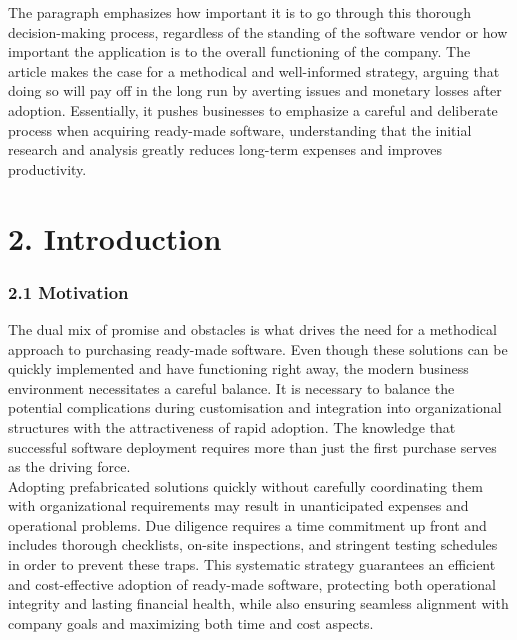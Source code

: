 \documentclass[letterpaper, 11pt]{report}
\begin{document}
The paragraph emphasizes how important it is to go through this thorough decision-making process, regardless of the standing of the software vendor or how important the application is to the overall functioning of the company. The article makes the case for a methodical and well-informed strategy, arguing that doing so will pay off in the long run by averting issues and monetary losses after adoption. Essentially, it pushes businesses to emphasize a careful and deliberate process when acquiring ready-made software, understanding that the initial research and analysis greatly reduces long-term expenses and improves productivity.\\

\section*{2. Introduction}
\subsubsection*{2.1 Motivation}
\normalsize {The dual mix of promise and obstacles is what drives the need for a methodical approach to purchasing ready-made software. Even though these solutions can be quickly implemented and have functioning right away, the modern business environment necessitates a careful balance. It is necessary to balance the potential complications during customisation and integration into organizational structures with the attractiveness of rapid adoption. The knowledge that successful software deployment requires more than just the first purchase serves as the driving force.\\

Adopting prefabricated solutions quickly without carefully coordinating them with organizational requirements may result in unanticipated expenses and operational problems. Due diligence requires a time commitment up front and includes thorough checklists, on-site inspections, and stringent testing schedules in order to prevent these traps. This systematic strategy guarantees an efficient and cost-effective adoption of ready-made software, protecting both operational integrity and lasting financial health, while also ensuring seamless alignment with company goals and maximizing both time and cost aspects.\\
 }

\end{document}
